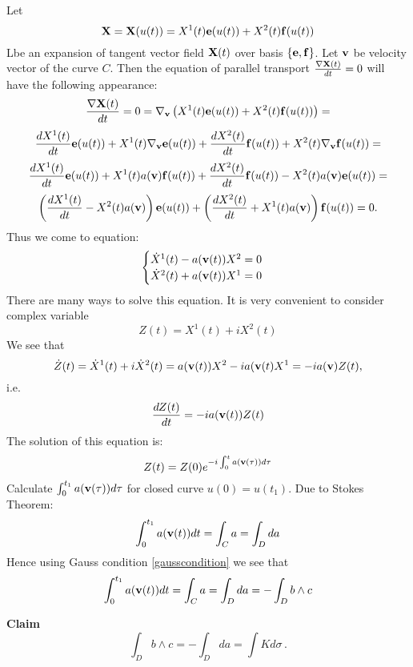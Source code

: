 \documentclass[12pt]{article}
\theoremstyle{theorem}
\numberwithin{equation}{section}
\begin{document}
Let        $$
{\bf X}={\bf X}(u(t))=X^1(t){\bf e}(u(t))+X^2(t){\bf f}(u(t))
           $$
Lbe an expansion of tangent vector field ${\bf X}(t)$ over basis $\{{\bf e},{\bf f}\}$.
Let ${\bf v}$ be velocity vector of the curve $C$.
  Then the equation of parallel transport ${\nabla {\bf X}(t)\over dt}=0$
                 will have the following appearance:
                      $$
              {\nabla {\bf X}(t)\over dt}=0=\nabla_{\bf v} \left(X^1(t){\bf e}(u(t))+X^2(t){\bf f}(u(t))\right)=
                      $$
                      $$
                      {dX^1(t)\over dt}{\bf e}(u(t))+X^1(t)\nabla_{\bf v}{\bf e}(u(t))+
                      {dX^2(t)\over dt}{\bf f}(u(t))+X^2(t)\nabla_{\bf v}{\bf f}(u(t))=
                      $$
                      $$
                      {dX^1(t)\over dt}{\bf e}(u(t))+X^1(t)a({\bf v}){\bf f}(u(t))+
                      {dX^2(t)\over dt}{\bf f}(u(t))-X^2(t)a({\bf v}){\bf e}(u(t))=
                      $$
              $$
          \left({dX^1(t)\over dt}-X^2(t)a({\bf v})\right){\bf e}(u(t))+
           \left({dX^2(t)\over dt}+X^1(t)a({\bf v})\right){\bf f}(u(t))=0.
              $$
Thus we come to equation:
              $$
             \begin{cases}
             \dot X^1(t)-a({\bf v}(t))X^2=0\cr
             \dot X^2(t)+a({\bf v}(t))X^1=0\cr
             \end{cases}
              $$
There are many ways to solve this equation. It is very convenient to consider complex variable
             $$
           Z(t)=X^1(t)+iX^2(t)
             $$
We see that
             $$
         \dot Z(t)=\dot X^1(t)+i\dot X^2(t)=a({\bf v}(t))X^2-ia({\bf v}(t)X^1=-ia({\bf v})Z(t),
                 $$
i.e.
   \begin{equation}\label{complexrotation}
    {dZ(t)\over dt}=-ia({\bf v}(t))Z(t)
   \end{equation}
The solution of this equation is:
           \begin{equation}\label{complexrotation}
      Z(t)=Z(0)e^{-i\int_0^t a({\bf v}(\tau))d\tau}
   \end{equation}
   Calculate $\int_0^{t_1} a({\bf v}(\tau))d\tau$ for closed curve $u(0)=u(t_1)$. Due to Stokes Theorem:
            $$
            \int_0^{t_1} a({\bf v}(t))dt=\int_C a=\int_D da
            $$
   Hence using Gauss condition \eqref{gausscondition} we see that
      $$
      \int_0^{t_1} a({\bf v}(t))dt=\int_C a=\int_D da=-\int_D b\wedge c
      $$

{\bf Claim}
            \begin{equation}\label{claimoncurvature}
            \int_D b\wedge c=-\int_D da=\int K d\sigma\,.
            \end{equation}
\end{document}
